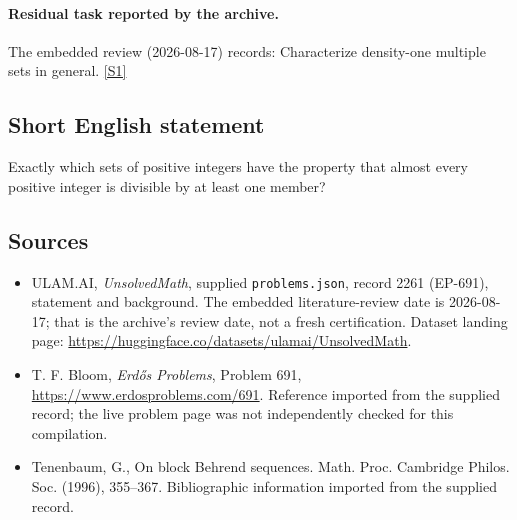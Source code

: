 \documentclass[11pt,a4paper]{article}
\newcommand{\sref}[2]{\hyperlink{source:#1:#2}{[S#2]}}
\begin{document}
\paragraph{Residual task reported by the archive.}

The embedded review (2026-08-17) records: Characterize density-one multiple sets in general. \sref{2261}{1}

\subsection{Short English statement}

Exactly which sets of positive integers have the property that almost every positive integer is divisible by at least one member?

\subsection{Sources}

{\small

\begin{itemize}

\item[\hypertarget{source:2261:1}{S1}] ULAM.AI, \emph{UnsolvedMath}, supplied \texttt{problems.json}, record 2261 (EP-691), statement and background. The embedded literature-review date is 2026-08-17; that is the archive’s review date, not a fresh certification. Dataset landing page: \url{https://huggingface.co/datasets/ulamai/UnsolvedMath}.

\item[\hypertarget{source:2261:2}{S2}] T. F. Bloom, \emph{Erdős Problems}, Problem 691, \url{https://www.erdosproblems.com/691}. Reference imported from the supplied record; the live problem page was not independently checked for this compilation.

\item[\hypertarget{source:2261:3}{S3}] Tenenbaum, G., On block {B}ehrend sequences. Math. Proc. Cambridge Philos. Soc. (1996), 355--367. Bibliographic information imported from the supplied record.

\end{itemize}

}

\label{end:2261}
\end{document}

